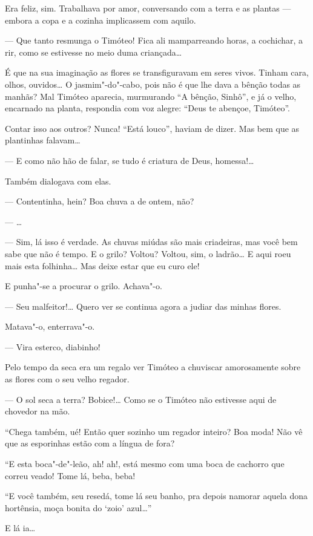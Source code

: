 Era feliz, sim. Trabalhava por amor, conversando com a terra e as
plantas --- embora a copa e a cozinha implicassem com aquilo.

--- Que tanto resmunga o Timóteo! Fica ali mamparreando horas, a
cochichar, a rir, como se estivesse no meio duma criançada\ldots{}

É que na sua imaginação as flores se transfiguravam em seres vivos.
Tinham cara, olhos, ouvidos\ldots{} O jasmim"-do"-cabo, pois não é que lhe dava
a bênção todas as manhãs? Mal Timóteo aparecia, murmurando ``A bênção,
Sinhô'', e já o velho, encarnado na planta, respondia com voz alegre:
``Deus te abençoe, Timóteo''.

Contar isso aos outros? Nunca! ``Está louco'', haviam de dizer. Mas bem
que as plantinhas falavam\ldots{}

--- E como não hão de falar, se tudo é criatura de Deus, homessa!\ldots{}

Também dialogava com elas.

--- Contentinha, hein? Boa chuva a de ontem, não?

--- \ldots{}

--- Sim, lá isso é verdade. As chuvas miúdas são mais criadeiras, mas
você bem sabe que não é tempo. E o grilo? Voltou? Voltou, sim, o
ladrão\ldots{} E aqui roeu mais esta folhinha\ldots{} Mas deixe estar que eu curo
ele!

E punha"-se a procurar o grilo. Achava"-o.

--- Seu malfeitor!\ldots{} Quero ver se continua agora a judiar das minhas
flores.

Matava"-o, enterrava"-o.

--- Vira esterco, diabinho!

Pelo tempo da seca era um regalo ver Timóteo a chuviscar amorosamente
sobre as flores com o seu velho regador.

--- O sol seca a terra? Bobice!\ldots{} Como se o Timóteo não estivesse aqui
de chovedor na mão.

``Chega também, ué! Então quer sozinho um regador inteiro? Boa moda! Não
vê que as esporinhas estão com a língua de fora?

``E esta boca"-de"-leão, ah! ah!, está mesmo com uma boca de cachorro que
correu veado! Tome lá, beba, beba!

``E você também, seu resedá, tome lá seu banho, pra depois namorar
aquela dona hortênsia, moça bonita do `zoio' azul\ldots{}''

E lá ia\ldots{}

